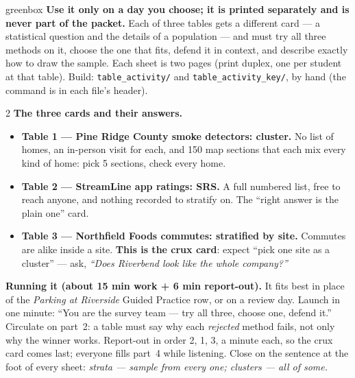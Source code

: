 \documentclass[10pt]{article}
\begin{document}
\boxguard
\begin{skillbox}{greenbox}
\textbf{Use it only on a day you choose; it is printed separately and is never part of the
packet.} Each of three tables gets a different card --- a statistical question and the details
of a population --- and must try all three methods on it, choose the one that fits, defend it in
context, and describe exactly how to draw the sample. Each sheet is two pages (print duplex, one
per student at that table). Build: \texttt{table\_activity/} and \texttt{table\_activity\_key/},
by hand (the command is in each file's header).
\begin{multicols}{2}
\textbf{The three cards and their answers.}
\begin{itemize}[leftmargin=1.1em, nosep, itemsep=2pt]
  \item \textbf{Table 1 --- Pine Ridge County smoke detectors: cluster.} No list of homes, an
        in-person visit for each, and 150 map sections that each mix every kind of home: pick 5
        sections, check every home.
  \item \textbf{Table 2 --- StreamLine app ratings: SRS.} A full numbered list, free to reach
        anyone, and nothing recorded to stratify on. The ``right answer is the plain one'' card.
  \item \textbf{Table 3 --- Northfield Foods commutes: stratified by site.} Commutes are alike
        inside a site. \textbf{This is the crux card}: expect ``pick one site as a cluster'' ---
        ask, \emph{``Does Riverbend look like the whole company?''}
\end{itemize}
\columnbreak
\textbf{Running it (about 15 min work + 6 min report-out).} It fits best in place of the
\emph{Parking at Riverside} Guided Practice row, or on a review day. Launch in one minute:
``You are the survey team --- try all three, choose one, defend it.'' Circulate on part~2: a
table must say why each \emph{rejected} method fails, not only why the winner works. Report-out
in order 2, 1, 3, a minute each, so the crux card comes last; everyone fills part~4 while
listening. Close on the sentence at the foot of every sheet: \emph{strata --- sample from every
one; clusters --- all of some.}
\end{multicols}
\end{skillbox}
\end{document}

